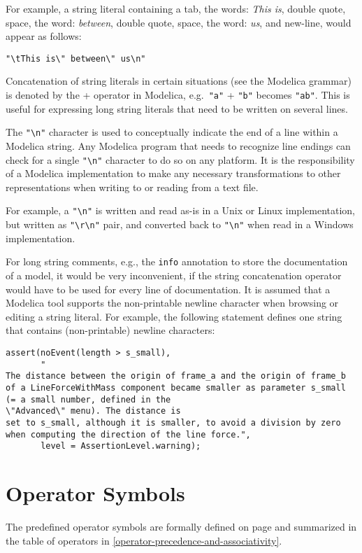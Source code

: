 For example, a string literal containing a tab, the words: \emph{This is},
double quote, space, the word: \emph{between}, double quote, space, the word:
\emph{us}, and new-line, would appear as follows:
\begin{lstlisting}[language=modelica]
"\tThis is\" between\" us\n"
\end{lstlisting}

Concatenation of string literals in certain situations (see the Modelica
grammar) is denoted by the + operator in Modelica, e.g.\ \lstinline!"a"! + \lstinline!"b"!
becomes \lstinline!"ab"!. This is useful for expressing long string literals that
need to be written on several lines.

The \lstinline!"\n"! character is used to conceptually indicate the
end of a line within a Modelica string. Any Modelica program that needs
to recognize line endings can check for a single \lstinline!"\n"!
character to do so on any platform. It is the responsibility of a
Modelica implementation to make any necessary transformations to other
representations when writing to or reading from a text file.

\begin{nonnormative}
For example, a \lstinline!"\n"! is written and read as-is in a Unix or Linux implementation, but written as
\lstinline!"\r\n"! pair, and converted back to \lstinline!"\n"! when read in a Windows implementation.
\end{nonnormative}

\begin{nonnormative}
For long string comments, e.g., the \lstinline!info! annotation to
store the documentation of a model, it would be very inconvenient, if
the string concatenation operator would have to be used for every line
of documentation. It is assumed that a Modelica tool supports the
non-printable newline character when browsing or editing a string
literal. For example, the following statement defines one string that
contains (non-printable) newline characters:
\begin{lstlisting}[language=modelica]
assert(noEvent(length > s_small),
       "
The distance between the origin of frame_a and the origin of frame_b
of a LineForceWithMass component became smaller as parameter s_small
(= a small number, defined in the
\"Advanced\" menu). The distance is
set to s_small, although it is smaller, to avoid a division by zero
when computing the direction of the line force.",
       level = AssertionLevel.warning);
\end{lstlisting}
\end{nonnormative}

\section{Operator Symbols}\label{operator-symbols}

The predefined operator symbols are formally defined on page \pageref{lexical-conventions} and
summarized in the table of operators in \cref{operator-precedence-and-associativity}.
